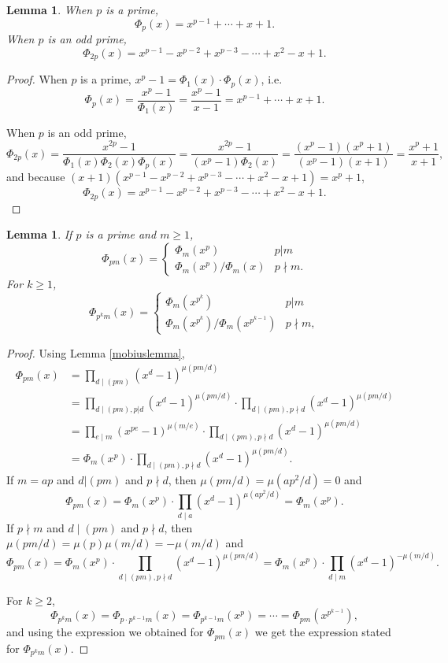 \documentclass{amsart}
\newtheorem{lemma}[theorem]{Lemma}
\theoremstyle{definition}
\begin{document}
\begin{lemma}
When $p$ is a prime,
\[
\Phi_p(x)  = x^{p-1}+\cdots+x+1.
\]
When $p$ is an odd prime,
\[
\Phi_{2p}(x)  = x^{p-1}-x^{p-2}+x^{p-3}-\cdots+x^2-x+1.
\]
\end{lemma}
\begin{proof}
When $p$ is a prime, $x^p-1 = \Phi_1(x) \cdot \Phi_p(x)$, i.e. 
\[
\Phi_p(x) =\frac{x^p-1}{\Phi_1(x)}= \frac{x^p-1}{x-1} = x^{p-1}+\cdots+x+1.
\]

When $p$ is an odd prime, 
\[
\Phi_{2p}(x) = \frac{x^{2p}-1}{\Phi_1(x) \Phi_2(x) \Phi_p(x)}
 = \frac{x^{2p}-1}{(x^p-1) \Phi_2(x)}
  = 
\frac{(x^p-1)(x^p+1)}{(x^p-1) (x+1)}
=\frac{x^p+1}{x+1},
\]
and because $(x+1)(x^{p-1}-x^{p-2}+x^{p-3}-\cdots+x^2-x+1) = x^p+1$,
\[
\Phi_{2p}(x) = x^{p-1}-x^{p-2}+x^{p-3}-\cdots+x^2-x+1.
\]
\end{proof}




\begin{lemma}
If $p$ is a prime and $m \geq 1$, 
\[
\Phi_{pm}(x)=
\begin{cases}
\Phi_m(x^p)& p | m\\
\Phi_m(x^p)/\Phi_m(x)&p \nmid m.
\end{cases}
\]
For $k \geq 1$,
\[
\Phi_{p^k m}(x)=
\begin{cases}
\Phi_m(x^{p^k})& p | m\\
\Phi_m(x^{p^k})/\Phi_m(x^{p^{k-1}})&p \nmid m,
\end{cases}
\]
\label{pmPhi}
\end{lemma}
\begin{proof}
Using Lemma \ref{mobiuslemma},
\begin{align*}
\Phi_{pm}(x)&= \prod_{d \mid (pm)} (x^d-1)^{\mu(pm/d)}\\
&= \prod_{d \mid (pm), p|d} (x^d-1)^{\mu(pm/d)} \cdot  \prod_{d \mid (pm), p \nmid d} (x^d-1)^{\mu(pm/d)}\\
&= \prod_{e \mid m} (x^{pe}-1)^{\mu(m/e)} \cdot  \prod_{d \mid (pm), p \nmid d} (x^d-1)^{\mu(pm/d)}\\
&=\Phi_m(x^p) \cdot \prod_{d \mid (pm), p \nmid d} (x^d-1)^{\mu(pm/d)}.
\end{align*}
If $m=ap$ and $d|(pm)$ and $p \nmid d$,  then $\mu(pm/d)=\mu(ap^2/d)=0$ and
\[
\Phi_{pm}(x) = \Phi_m(x^p) \cdot \prod_{d \mid a} (x^d-1)^{\mu(ap^2/d)} = \Phi_m(x^p).
\]
If $p \nmid m$ and $d \mid (pm)$ and $p \nmid d$, then $\mu(pm/d) = \mu(p) \mu(m/d)=-\mu(m/d)$ and
\[
\Phi_{pm}(x) = \Phi_m(x^p) \cdot  \prod_{d \mid (pm), p \nmid d} (x^d-1)^{\mu(pm/d)} = 
\Phi_m(x^p) \cdot \prod_{d \mid m} (x^d-1)^{-\mu(m/d)}.
\]

For $k \geq 2$,
\[
\Phi_{p^k m}(x) = \Phi_{p \cdot p^{k-1}m}(x) = \Phi_{p^{k-1}m}(x^p)
=\cdots = \Phi_{pm}(x^{p^{k-1}}),
\]
and using the expression we obtained for $\Phi_{pm}(x)$ we get
the expression stated for $\Phi_{p^km}(x)$. 
\end{proof}
\end{document}
